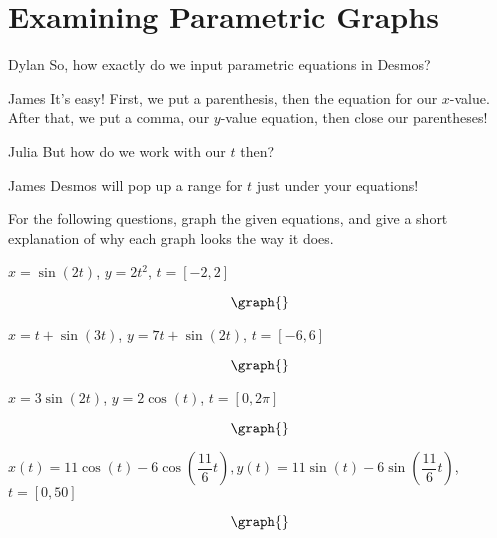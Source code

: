 \documentclass{ximera}
\begin{document}
\section{Examining Parametric Graphs}
\begin{dialogue}
\item[Dylan] So, how exactly do we input parametric equations in Desmos?
\item[James] It's easy! First, we put a parenthesis, then the equation for our $x$-value. After that, we put a comma, our $y$-value equation, then close our parentheses!
\item[Julia] But how do we work with our $t$ then?
\item[James] Desmos will pop up a range for $t$ just under your equations!
\end{dialogue}
For the following questions, graph the given equations, and give a short explanation of why each graph looks the way it does.
\begin{question}
$x = \sin(2t)$, $y = 2t^2$, $t = [-2,2]$

\[
\graph{}
\]

\begin{freeResponse}
\end{freeResponse}
$x = t + \sin(3t)$, $y = 7t + \sin(2t)$, $t = [-6,6]$

\[
\graph{}
\]

\begin{freeResponse}
\end{freeResponse}
$x = 3\sin(2t)$, $y = 2\cos(t)$, $t = [0,2\pi]$

\[
\graph{}
\]

\begin{freeResponse}
\end{freeResponse}
$x(t) = 11\cos(t) - 6\cos\left(\dfrac{11}{6}t\right), y(t) = 11\sin(t) - 6\sin\left(\dfrac{11}{6} t\right)$, $t = [0,50]$

\[
\graph{}
\]

\begin{freeResponse}
\end{freeResponse}
\end{question}
\end{document}
